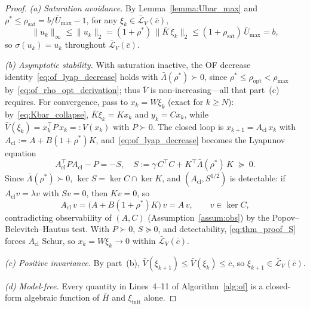 \documentclass[final,5p,times,authoryear]{elsarticle}
\theoremstyle{plain}
\theoremstyle{definition}
\theoremstyle{remark}
\begin{document}
\begin{proof}
\emph{(a) Saturation avoidance.}  By Lemma~\ref{lemma:Ubar_max} and
$\rho^{*} \leq \rho_{\mathrm{sat}} = b/\bar U_{\max} - 1$, for any
$\xi_k \in \bar{\mathcal L}_V(\bar c)$,
\begin{equation}
\|u_k\|_\infty \leq \|u_k\|_2
   = (1+\rho^{*})\,\|\bar K\,\xi_k\|_2
   \leq (1+\rho_{\mathrm{sat}})\,\bar U_{\max} = b,
\label{eq:of_sat_chain}
\end{equation}
so $\sigma(u_k) = u_k$ throughout $\bar{\mathcal L}_V(\bar c)$.

\emph{(b) Asymptotic stability.}  With saturation inactive, the OF
decrease identity~\eqref{eq:of_lyap_decrease} holds with
$\bar\Lambda(\rho^{*}) \succ 0$, since
$\rho^{*} \leq \rho_{\mathrm{opt}} < \rho_{\max}$
by~\eqref{eq:of_rho_opt_derivation}; thus $\bar V$ is
non-increasing---all that part~(c) requires.  For convergence, pass to
$x_k = W\xi_k$ (exact for $k \geq N$): by~\eqref{eq:Kbar_collapse},
$\bar K\xi_k = Kx_k$ and $y_k = Cx_k$, while
$\bar V(\xi_k) = x_k^{\!\top}P\,x_k =: V(x_k)$ with $P \succ 0$.  The
closed loop is $x_{k+1} = A_{\mathrm{cl}}\,x_k$ with
$A_{\mathrm{cl}} := A + B(1+\rho^{*})K$,
and~\eqref{eq:of_lyap_decrease} becomes the Lyapunov equation
\begin{equation}
A_{\mathrm{cl}}^{\!\top} P A_{\mathrm{cl}} - P = -S,
\quad
S := \gamma\,C^{\!\top}\!C
     + K^{\!\top}\bar\Lambda(\rho^{*})\,K \;\succeq\; 0.
\label{eq:thm_proof_S}
\end{equation}
Since $\bar\Lambda(\rho^{*}) \succ 0$,
$\ker S = \ker C \cap \ker K$, and $(A_{\mathrm{cl}}, S^{1/2})$ is
detectable: if $A_{\mathrm{cl}}v = \lambda v$ with $S v = 0$, then
$Kv = 0$, so
\begin{equation}
A_{\mathrm{cl}}\,v = \bigl(A + B(1+\rho^{*})K\bigr)\,v = A\,v,
\qquad v \in \ker C,
\label{eq:of_pbh}
\end{equation}
contradicting observability of $(A, C)$
(Assumption~\ref{assum:obs}) by the Popov--Belevitch--Hautus test.
With $P \succ 0$, $S \succeq 0$, and detectability,
\eqref{eq:thm_proof_S} forces $A_{\mathrm{cl}}$ Schur, so
$x_k = W\xi_k \to 0$ within $\bar{\mathcal L}_V(\bar c)$.

\emph{(c) Positive invariance.}  By part~(b),
$\bar V(\xi_{k+1}) \leq \bar V(\xi_k) \leq \bar c$, so
$\xi_{k+1} \in \bar{\mathcal L}_V(\bar c)$.

\emph{(d) Model-free.}  Every quantity in Lines~4--11 of
Algorithm~\ref{alg:of} is a closed-form algebraic function of $\bar H$
and $\xi_{\mathrm{init}}$ alone.


\end{proof}
\end{document}
